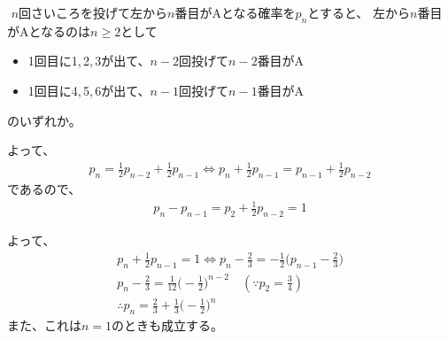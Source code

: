 \documentclass[a4paper]{ltjsarticle}
\begin{document}
\clearpage
{}
\begin{ans*}
  ${}$
  $n$回さいころを投げて左から$n$番目がAとなる確率を$p_{n}$とすると、
  左から$n$番目がAとなるのは$n\geq 2$として
  \begin{itemize}
    \item 1回目に1,\,2,\,3が出て、$n-2$回投げて$n-2$番目がA
    \item 1回目に4,\,5,\,6が出て、$n-1$回投げて$n-1$番目がA
  \end{itemize}
  のいずれか。

  よって、
  \begin{gather*}
    p_{n} = \frac{1}{2}p_{n-2} + \frac{1}{2}p_{n-1}
    \Longleftrightarrow p_{n} + \frac{1}{2}p_{n-1} = p_{n-1} + \frac{1}{2}p_{n-2}
  \end{gather*}
  であるので、
  \begin{gather*}
    p_{n} - p_{n-1} = p_{2} + \frac{1}{2} p_{n-2} = 1
  \end{gather*}

  よって、
  \begin{gather*}
    p_{n} + \frac{1}{2} p_{n-1} = 1
    \Longleftrightarrow p_{n} - \frac{2}{3} = -\frac{1}{2}\biggl( p_{n-1} - \frac{2}{3} \biggr) \\
    p_{n} - \frac{2}{3} = \frac{1}{12} \biggl(-\frac{1}{2}\biggr)^{n-2} \quad (\because p_{2} = \frac{3}{4}) \\
    \therefore p_{n} = \frac{2}{3} + \frac{1}{3} \biggl(-\frac{1}{2}\biggr)^{n}
  \end{gather*}
  また、これは$n=1$のときも成立する。
\end{ans*}
\end{document}
